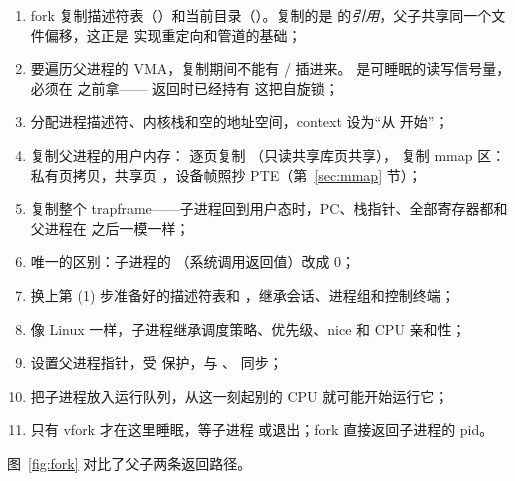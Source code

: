 \begin{enumerate}
  \item fork 复制描述符表（）和当前目录（）。复制的是  的\emph{引用}，父子共享同一个文件偏移，这正是  实现重定向和管道的基础；
  \item {} 要遍历父进程的 VMA，复制期间不能有 / 插进来。 是可睡眠的读写信号量，必须在  之前拿—— 返回时已经持有  这把自旋锁；
  \item 分配进程描述符、内核栈和空的地址空间，context 设为“从  开始”；
  \item 复制父进程的用户内存： 逐页复制 \code{[0, sz)}（只读共享库页共享）， 复制 mmap 区：私有页拷贝，共享页 ，设备帧照抄 PTE（第~\ref{sec:mmap} 节）；
  \item 复制整个 trapframe——子进程回到用户态时，PC、栈指针、全部寄存器都和父进程在  之后一模一样；
  \item 唯一的区别：子进程的 （系统调用返回值）改成 0；
  \item 换上第 (1) 步准备好的描述符表和 ，继承会话、进程组和控制终端；
  \item 像 Linux 一样，子进程继承调度策略、优先级、nice 和 CPU 亲和性；
  \item 设置父进程指针，受  保护，与 、 同步；
  \item 把子进程放入运行队列，从这一刻起别的 CPU 就可能开始运行它；
  \item 只有 vfork 才在这里睡眠，等子进程  或退出；fork 直接返回子进程的 pid。
\end{enumerate}

图~\ref{fig:fork} 对比了父子两条返回路径。

